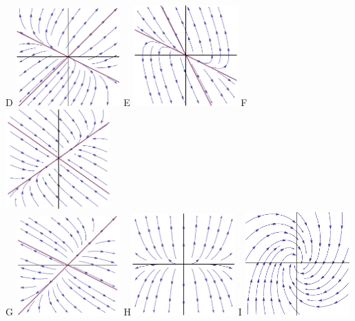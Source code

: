 \documentclass[epsf]{article}
\begin{document}
\begin{center}
\vskip 1cm
D \includegraphics[width=40mm]{source1.png}\hspace{0.6 cm} E \includegraphics[width=40mm]{source2.png}\hspace{0.6 cm} F \includegraphics[width=40mm]{sink.png}\\
\vskip 1cm
G \includegraphics[width=40mm]{source4.png}\hspace{0.6 cm} H\includegraphics[width=40mm]{source3.png}\hspace{0.6 cm} I \includegraphics[width=40mm]{stable_spiral.png}\\

\end{center}
\end{document}
